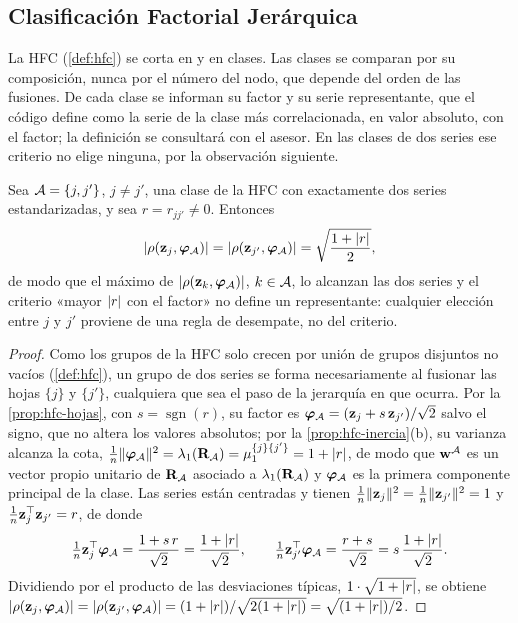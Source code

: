 \subsection{Clasificación Factorial Jerárquica}
\label{sec:met-hfc}

La HFC (\cref{def:hfc}) se corta en \clasesHfcMenor{} y en \clasesHfcMayor{} clases. Las clases se comparan por su composición,
nunca por el número del nodo, que depende del orden de las fusiones. De cada clase se informan su
factor y su serie representante, que el código define como la serie de la clase más
correlacionada, en valor absoluto, con el factor; la definición se consultará con el asesor. En las
clases de dos series ese criterio no elige ninguna, por la observación siguiente.

\begin{observacion}\label{obs:hfc-representante-dos}
Sea $\mathcal{A}=\{j,j'\}$, $j\ne j'$, una clase de la HFC con exactamente dos series estandarizadas, y sea
$r=r_{jj'}\ne0$. Entonces
\[
  \lvert \rho(\mathbf{z}_j,\boldsymbol{\varphi}_{\mathcal{A}})\rvert=\lvert \rho(\mathbf{z}_{j'},\boldsymbol{\varphi}_{\mathcal{A}})\rvert=\sqrt{\frac{1+\lvert r\rvert}{2}},
\]
de modo que el máximo de $\lvert \rho(\mathbf{z}_k,\boldsymbol{\varphi}_{\mathcal{A}})\rvert$, $k\in\mathcal{A}$, lo alcanzan las dos series y
el criterio «mayor $\lvert r\rvert$ con el factor» no define un representante: cualquier elección entre
$j$ y $j'$ proviene de una regla de desempate, no del criterio.
\end{observacion}

\begin{proof}
Como los grupos de la HFC solo crecen por unión de grupos disjuntos no vacíos
(\cref{def:hfc}), un grupo de dos series se forma necesariamente al fusionar las hojas $\{j\}$ y
$\{j'\}$, cualquiera que sea el paso de la jerarquía en que ocurra. Por la
\cref{prop:hfc-hojas}, con $s=\operatorname{sgn}(r)$, su factor es
$\boldsymbol{\varphi}_{\mathcal{A}}=(\mathbf{z}_j+s\,\mathbf{z}_{j'})/\sqrt2$ salvo el signo, que no altera los valores absolutos; por
la \cref{prop:hfc-inercia}(b), su varianza alcanza la cota,
$\frac1n\lVert \boldsymbol{\varphi}_{\mathcal{A}}\rVert^2=\lambda_1(\mathbf{R}_{\mathcal{A}})=\mu_1^{\{j\}\{j'\}}=1+\lvert r\rvert$, de modo que
$\mathbf{w}^{\mathcal{A}}$ es un vector propio unitario de $\mathbf{R}_{\mathcal{A}}$ asociado a $\lambda_1(\mathbf{R}_{\mathcal{A}})$ y
$\boldsymbol{\varphi}_{\mathcal{A}}$ es la primera componente principal de la clase. Las
series están centradas y tienen $\frac1n\lVert \mathbf{z}_j\rVert^2=\frac1n\lVert \mathbf{z}_{j'}\rVert^2=1$ y
$\frac1n\mathbf{z}_j^{\top}\mathbf{z}_{j'}=r$, de donde
\[
  \tfrac1n\mathbf{z}_j^{\top}\boldsymbol{\varphi}_{\mathcal{A}}=\frac{1+s\,r}{\sqrt2}=\frac{1+\lvert r\rvert}{\sqrt2},\qquad
  \tfrac1n\mathbf{z}_{j'}^{\top}\boldsymbol{\varphi}_{\mathcal{A}}=\frac{r+s}{\sqrt2}=s\,\frac{1+\lvert r\rvert}{\sqrt2}.
\]
Dividiendo por el producto de las desviaciones típicas, $1\cdot\sqrt{1+\lvert r\rvert}$, se obtiene
$\lvert \rho(\mathbf{z}_j,\boldsymbol{\varphi}_{\mathcal{A}})\rvert=\lvert \rho(\mathbf{z}_{j'},\boldsymbol{\varphi}_{\mathcal{A}})\rvert=(1+\lvert r\rvert)/\sqrt{2(1+\lvert r\rvert)}=
\sqrt{(1+\lvert r\rvert)/2}$.
\end{proof}

